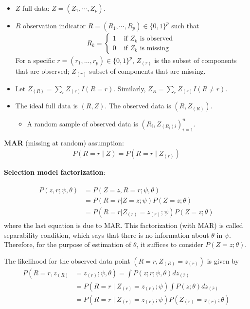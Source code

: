 \documentclass[
  14pt,
]{article}
\providecommand{\tightlist}{%
  \setlength{\itemsep}{0pt}\setlength{\parskip}{0pt}}
\begin{document}
\begin{itemize}
\tightlist
\item
  \(Z\) full data: \(Z=\left(Z_1, \cdots, Z_p\right)\).
\item
  \(R\) observation indicator
  \(R=\left(R_1, \cdots, R_p\right) \in \{0,1\}^p\) such that
  \begin{align*}
  R_k= \begin{cases}1 & \text { if } Z_k \text { is observed } \\ 0 & \text { if } Z_k \text { is missing }\end{cases}
  \end{align*} For a specific
  \(r=\left(r_1, \ldots, r_p\right) \in\{0,1\}^p\), \(Z_{(r)}\) is the
  subset of components that are observed; \(Z_{(\bar{r})}\) subset of
  components that are missing.
\item
  Let \(Z_{(R)}=\sum_r Z_{(r)} I(R=r)\). Similarly,
  \(Z_{\bar{R}}=\sum_{r} Z_{(r)} I(R \neq r)\).
\item
  The ideal full data is \((R, Z)\). The observed data is
  \(\left(R, Z_{(R)}\right)\).

  \begin{itemize}
  \tightlist
  \item
    A random sample of observed data is
    \(\left(R_i, Z_{(R_i)i}\right)_{i=1}^n.\)
  \end{itemize}
\end{itemize}

\textbf{MAR} (missing at random) assumption: \begin{align*}
P(R=r \mid Z)=P(R=r \mid Z_{(r)})
\end{align*}

\textbf{Selection model factorization}:

\begin{align*}
\begin{aligned}
P(z, r ; \psi, \theta) & =P(Z=z, R=r ; \psi, \theta) \\
& =P(R=r|Z=z ; \psi) P(Z=z ; \theta) \\
 & =P(R=r| Z_{(r)}=z_{(r)} ; \psi) P(Z=z ; \theta)
\end{aligned}
\end{align*} where the last equation is due to MAR. This factorization
(with MAR) is called separability condition, which says that there is no
information about \(\theta\) in \(\psi.\) Therefore, for the purpose of
estimation of \(\theta\), it suffices to consider \(P(Z=z ; \theta).\)

The likelihood for the observed data point
\(\left(R=r, Z_{(R)}=z_{(r)}\right)\) is given by \begin{align*}
P\left(R=r, z_{(R)}\right. & \left.=z_{(r)} ; \psi, \theta\right)=\int P(z ; r ; \psi, \theta) d z_{(\bar{r})} \\
& =P\left(R=r \mid Z_{(r)}=z_{(r)} ; \psi\right) \int P(z ; \theta) d z_{(\bar{r})} \\
& =P\left(R=r \mid Z_{(r)}=z_{(r)} ; \psi\right) P\left(Z_{(r)}=z_{(r)} ; \theta\right)
\end{align*}
\end{document}
